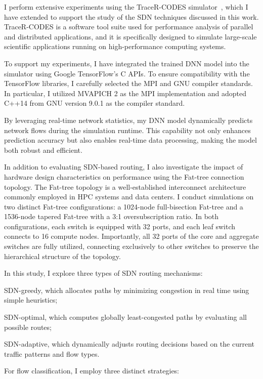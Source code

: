 I perform extensive experiments using the TraceR-CODES simulator~\cite{jain2016evaluating,mubarak2016enabling}, which I have extended to support the study of the SDN techniques discussed in this work. TraceR-CODES is a software tool suite used for performance analysis of parallel and distributed applications, and it is specifically designed to simulate large-scale scientific applications running on high-performance computing systems.

To support my experiments, I have integrated the trained DNN model into the simulator using Google TensorFlow's C APIs. To ensure compatibility with the TensorFlow libraries, I carefully selected the MPI and GNU compiler standards. In particular, I utilized MVAPICH 2 as the MPI implementation and adopted C++14 from GNU version 9.0.1 as the compiler standard.

By leveraging real-time network statistics, my DNN model dynamically predicts network flows during the simulation runtime. This capability not only enhances prediction accuracy but also enables real-time data processing, making the model both robust and efficient.

In addition to evaluating SDN-based routing, I also investigate the impact of hardware design characteristics on performance using the Fat-tree connection topology. The Fat-tree topology is a well-established interconnect architecture commonly employed in HPC systems and data centers. I conduct simulations on two distinct Fat-tree configurations: a 1024-node full-bisection Fat-tree and a 1536-node tapered Fat-tree with a 3:1 oversubscription ratio. In both configurations, each switch is equipped with 32 ports, and each leaf switch connects to 16 compute nodes. Importantly, all 32 ports of the core and aggregate switches are fully utilized, connecting exclusively to other switches to preserve the hierarchical structure of the topology.

In this study, I explore three types of SDN routing mechanisms:

SDN-greedy, which allocates paths by minimizing congestion in real time using simple heuristics;

SDN-optimal, which computes globally least-congested paths by evaluating all possible routes;

SDN-adaptive, which dynamically adjusts routing decisions based on the current traffic patterns and flow types.

For flow classification, I employ three distinct strategies:

